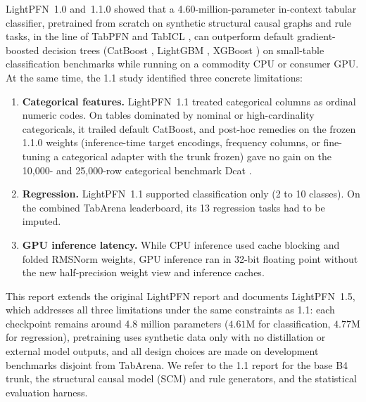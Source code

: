 \documentclass[11pt]{article}
\begin{document}
LightPFN~1.0 and~1.1.0 \cite{ottoboni2026lightpfn} showed that a 4.60-million-parameter in-context tabular classifier, pretrained from scratch on synthetic structural causal graphs and rule tasks, in the line of TabPFN \cite{hollmann2025} and TabICL \cite{qu2025}, can outperform default gradient-boosted decision trees (CatBoost \cite{prokhorenkova2018}, LightGBM \cite{ke2017}, XGBoost \cite{chen2016}) on small-table classification benchmarks while running on a commodity CPU or consumer GPU.
At the same time, the 1.1 study identified three concrete limitations:
\begin{enumerate}
\item \textbf{Categorical features.} LightPFN~1.1 treated categorical columns as ordinal numeric codes. On tables dominated by nominal or high-cardinality categoricals, it trailed default CatBoost, and post-hoc remedies on the frozen 1.1.0 weights (inference-time target encodings, frequency columns, or fine-tuning a categorical adapter with the trunk frozen) gave no gain on the 10,000- and 25,000-row categorical benchmark Dcat \cite[Section~12]{ottoboni2026lightpfn}.
\item \textbf{Regression.} LightPFN~1.1 supported classification only (2 to 10 classes). On the combined TabArena leaderboard, its 13 regression tasks had to be imputed.
\item \textbf{GPU inference latency.} While CPU inference used cache blocking and folded RMSNorm weights, GPU inference ran in 32-bit floating point without the new half-precision weight view and inference caches.
\end{enumerate}

This report extends the original LightPFN report \cite{ottoboni2026lightpfn} and documents LightPFN~1.5, which addresses all three limitations under the same constraints as 1.1: each checkpoint remains around 4.8 million parameters ($4.61\text{M}$ for classification, $4.77\text{M}$ for regression), pretraining uses synthetic data only with no distillation or external model outputs, and all design choices are made on development benchmarks disjoint from TabArena. %
We refer to the 1.1 report \cite{ottoboni2026lightpfn} for the base B4 trunk, the structural causal model (SCM) and rule generators, and the statistical evaluation harness.
\end{document}
